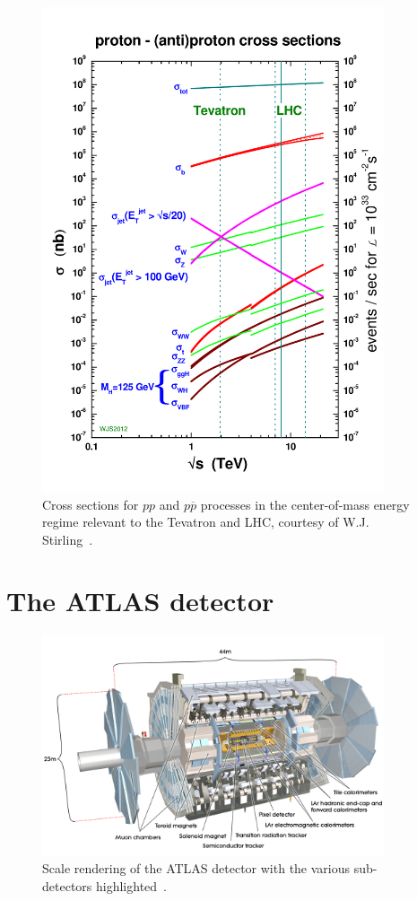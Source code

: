 \begin{figure}[tp]
  \centering
  \includegraphics[width=0.90\textwidth]{figures/lhc-atlas/crosssections2012_v5}
  \caption{Cross sections for $pp$ and $p\overline{p}$ processes in the center-of-mass energy regime relevant to the Tevatron and LHC, courtesy of W.J. Stirling~\cite{2013.stirling.cross-sections}.}
  \label{fig:lhc-stirling}
\end{figure}

\section{The ATLAS detector}
\label{sec:atlas}

\begin{figure}[tp]
  \centering
  \includegraphics[width=0.90\textwidth]{figures/lhc-atlas/atlas-0803012_01.jpg}
  \caption{Scale rendering of the ATLAS detector with the various sub-detectors highlighted~\cite{atlas-cgi-detector}.}
  \label{fig:atlas-cartoon}
\end{figure}

